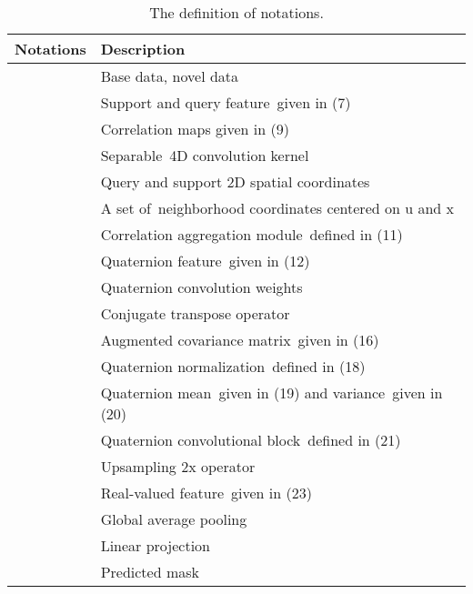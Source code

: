 \documentclass[lettersize,journal]{IEEEtran}
\begin{document}
\begin{table}
\renewcommand\arraystretch{1.3}
\centering
\caption{The definition of notations.}
\label{tab1}
\begin{tabular}{ll} 
\hline
Notations                                                   & Description                                               \\ 
\hline
 & Base data, novel data                                     \\
                                & Support and query feature~given in (7)                    \\
                                              & Correlation maps given in (9)                             \\
                                                & Separable~4D convolution kernel~                          \\
                                    & Query and support 2D spatial coordinates                  \\
                                    & A set of~neighborhood coordinates centered on u and x     \\
        & Correlation aggregation module~defined in (11)            \\
                                          & Quaternion feature~given in (12)                          \\
                                              & Quaternion convolution weights                            \\
                                        & Conjugate transpose operator                              \\
                           & Augmented covariance matrix~given in (16)                 \\
                                        & Quaternion normalization~defined in (18)                  \\
                 & Quaternion mean~given in (19) and variance~given in (20)  \\
       & Quaternion convolutional block~defined in (21)            \\
                             & Upsampling 2x operator                                    \\
                                              & Real-valued feature~given in (23)                         \\
                                        & Global average pooling                                    \\
                                      & Linear projection                                         \\
             
    & Predicted mask                                        \\
\hline
\end{tabular}
\end{table}
\end{document}
